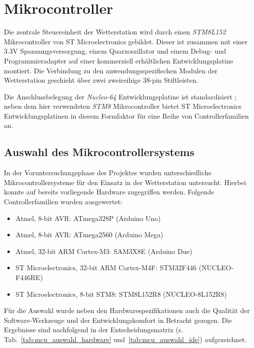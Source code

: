 \section{Mikrocontroller}
    Die zentrale Steuereinheit der Wetterstation wird durch einen \emph{STM8L152} Mikrocontroller von ST Microelectronics gebildet. Dieser ist zusammen mit einer 3.3V Spannungsversorgung, einem Quarzoszillator und einem Debug- und Programmieradapter auf einer kommerziell erhältlichen Entwicklungsplatine montiert. Die Verbindung zu den anwendungsspezifischen Modulen der Wetterstation geschieht über zwei zweireihige 38-pin Stiftleisten.
    
    Die Anschlussbelegung der \emph{Nucleo-64} Entwicklungsplatine ist standardisiert \cite{st_nucleo}; neben dem hier verwendeten \emph{STM8} Mikrocontroller bietet ST Microelectronics Entwicklungsplatinen in diesem Formfaktor für eine Reihe von Controllerfamilien an.
    
    \subsection{Auswahl des Mikrocontrollersystems}
    In der Voruntersuchungsphase des Projektes wurden unterschiedliche Mikrocontrollersysteme für den Einsatz in der Wetterstation untersucht. Hierbei konnte auf bereits vorliegende Hardware zugegriffen werden. Folgende Controllerfamilien wurden ausgewertet:
    \begin{itemize}
        \item Atmel, 8-bit AVR: ATmega328P (Arduino Uno)
        \item Atmel, 8-bit AVR: ATmega2560 (Arduino Mega)
        \item Atmel, 32-bit ARM Cortex-M3: SAM3X8E (Arduino Due)
        \item ST Microelectronics, 32-bit ARM Cortex-M4F: STM32F446 (NUCLEO-F446RE)
        \item ST Microelectronics, 8-bit STM8: STM8L152R8 (NUCLEO-8L152R8)
    \end{itemize}
    
    Für die Auswahl wurde neben den Hardwarespezifikationen auch die Qualität der Software-Werkzeuge und der Entwicklungskomfort in Betracht gezogen. Die Ergebnisse sind nachfolgend in der Entscheidungsmatrix (s. Tab.~\ref{tab:mcu_auswahl_hardware} und~\ref{tab:mcu_auswahl_ide}) aufgezeichnet.
    

